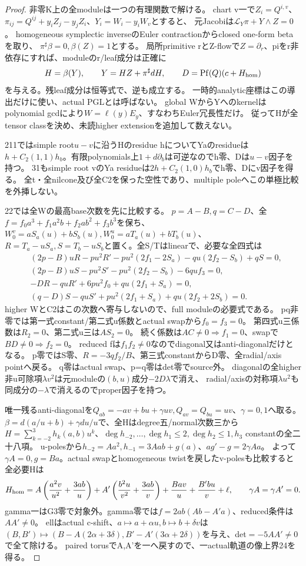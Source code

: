 \documentclass[a4paper,11pt]{ltjsarticle}
\theoremstyle{definition}
\begin{document}
\begin{proof}
非零K上の全moduleは一つの有理関数で解ける。
chart v一で$Z_i=Q^{i,v}$、$\pi_{ij}=Q^{ij}+y_iZ_j-y_jZ_i$、$Y_i=W_i-y_iW_v$とすると、
元Jacobiは$\mathcal L_Y\pi+Y\wedge Z=0$。
homogeneous symplectic inverseのEuler contractionからclosed one-form betaを取り、
$\pi^\sharp\beta=0,\beta(Z)=1$とする。
局所primitive rとZ-flowで$Z=\partial_r$、piをr非依存にすれば、moduleのr/leaf成分は正確に
\[
 H=\beta(Y),\qquad Y=HZ+\pi^\sharp dH,
 \qquad D=\operatorname{Pf}(Q)(c+H_{\rm hom})
\]
を与える。残leaf成分は恒等式で、逆も成立する。
一時的analytic座標はこの導出だけに使い、actual PGLとは呼ばない。
global WからYへのkernelはpolynomial gcdにより$W=\ell(y)E_y$、すなわちEuler冗長性だけ。
従ってHが全tensor classを決め、未読higher extensionを追加して数えない。

211ではsimple root$u-v$に沿うHのresidue hについてYaのresidueは
$h+C_2(1,1)h_b$。有限polynomials上$1+d\partial_b$は可逆なのでh零、Dは$u-v$因子を持つ。
31もsimple root vのYa residueは$2h+C_2(1,0)h_b$でh零、Dにv因子を得る。
全t・全nilcone及び全C2を保った空性であり、multiple poleへこの単極比較を外挿しない。

22では全Wの最高base次数を先に比較する。
$p=A-B,q=C-D$、全$f=f_0a^3+f_1a^2b+f_2ab^2+f_3b^3$を保ち、
$W_0^v=aS_a(u)+bS_b(u),W_0^u=aT_a(u)+bT_b(u)$、
$R=T_a-uS_a,S=T_b-uS_b$と置く。全S/Tはlinearで、必要な全四式は
\[
\begin{aligned}
 &(2p-B)uR-pu^2R'-pu^2(2f_1-2S_a)-qu(2f_2-S_b)+qS=0,\\
 &(2p-B)uS-pu^2S'-pu^2(2f_2-S_b)-6quf_3=0,\\
 &-DR-quR'+6pu^2f_0+qu(2f_1+S_a)=0,\\
 &(q-D)S-quS'+pu^2(2f_1+S_a)+qu(2f_2+2S_b)=0.
\end{aligned}
\]
higher WとC2はこの次数へ寄与しないので、full moduleの必要式である。
pq非零では第一式constant/第二式u係数とactual swapから$f_0=f_3=0$。
第四式u三係数は$R_2=0$、第二式u三は$AS_2=0$。
続く係数は$AC\ne0\Rightarrow f_1=0$、swapで$BD\ne0\Rightarrow f_2=0$。
reduced fは$f_1f_2\ne0$なのでdiagonal又はanti-diagonalだけとなる。
p零ではS零、$R=-3qf_2/B$、第三式constantからD零、全radial/axis pointへ戻る。
q零はactual swap、p=q零はdet零でsource外。
diagonalの全higher非u可除項$\lambda v^2$は元moduleの$(b,u)$成分$-2D\lambda$で消え、
radial/axisの対称項$\lambda u^2$も同成分の$-\lambda$で消えるのでproper因子を持つ。

唯一残るanti-diagonalを$Q_{ab}=-av+bu+\gamma uv,Q_{av}=Q_{bu}=uv$、$\gamma=0,1$へ取る。
$\beta=d(a/u+b)+\gamma du/u$で、全Hはdegree五/normal次数三から
$H=\sum_{k=-2}^{3}h_k(a,b)u^k$、$\deg h_{-2},\ldots,\deg h_1\le2,\deg h_2\le1,h_3$ constantの全二十八項。
u-polesから$h_{-2}=Aa^2,h_{-1}=3Aab+g(a)$、$ag'-g=2\gamma Aa$。
よって$\gamma A=0,g=Ba$。actual swapとhomogeneous twistを戻したv-polesも比較すると全必要Hは
\[
 H_{\rm hom}=A\left(\frac{a^2v}{u^2}+\frac{3ab}{u}\right)
 +A'\left(\frac{b^2u}{v^2}+\frac{3ab}{v}\right)
 +\frac{Bav}{u}+\frac{B'bu}{v}+\ell,
 \qquad\gamma A=\gamma A'=0.
\]
gamma一はG3零で対象外。gamma零では$f=2ab(Ab-A'a)$、reduced条件は$AA'\ne0$。
ellはactual c-shift、$a\mapsto a+\alpha u,b\mapsto b+\delta v$は
$(B,B')\mapsto(B-A(2\alpha+3\delta),B'-A'(3\alpha+2\delta))$を与え、det$=-5AA'\ne0$で全て除ける。
paired torusでA,A'を一へ戻すので、一actual軌道の像上界24を得る。


\end{proof}
\end{document}
